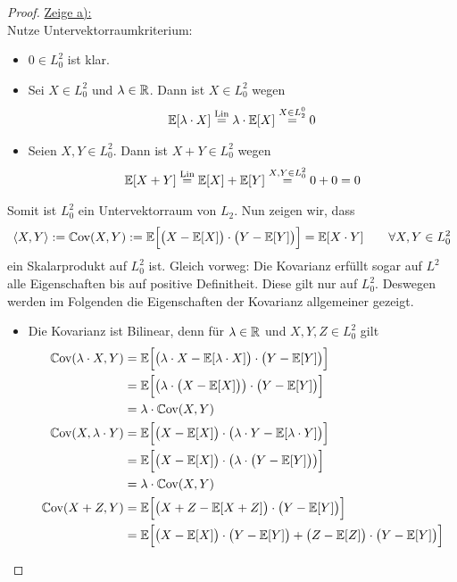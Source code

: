 \documentclass[12pt,a4paper]{article}
\begin{document}
\begin{proof}
\underline{Zeige a):}\\
Nutze Untervektorraumkriterium:
\begin{itemize}
\item $0\in L_0^2$ ist klar.
\item Sei $X\in L_0^2$ und $\lambda\in\mathbb{R}$. Dann ist $X\in L_0^2$ wegen
\begin{align*}
\mathbb{E}[\lambda\cdot X]\stackrel{\text{Lin}}{=}\lambda\cdot\mathbb{E}[X]\stackrel{X\in L_2^0}{=}0
\end{align*}
\item Seien $X,Y\in L_0^2$. Dann ist $X+Y\in L_0^2$ wegen
\begin{align*}
\mathbb{E}[X+Y]\stackrel{\text{Lin}}{=}\mathbb{E}[X]+\mathbb{E}[Y]\stackrel{X,Y\in L_0^2}{=}0+0=0
\end{align*}
\end{itemize}
Somit ist $L_0^2$ ein Untervektorraum von $L_2$. Nun zeigen wir, dass
\begin{align*}
\langle X,Y\rangle:=\mathbb{C}\text{ov}(X,Y):=
\mathbb{E}\Big[\big(X-\mathbb{E}[X]\big)\cdot\big(Y-\mathbb{E}[Y]\big)\Big]
=\mathbb{E}[X\cdot Y]
\qquad\forall X,Y\in L_0^2
\end{align*}
ein Skalarprodukt auf $L_0^2$ ist. Gleich vorweg: Die Kovarianz erfüllt sogar auf $L^2$ alle Eigenschaften bis auf positive Definitheit. Diese gilt nur auf $L_0^2$. Deswegen werden im Folgenden die Eigenschaften der Kovarianz allgemeiner gezeigt.
\begin{itemize}
\item Die Kovarianz ist Bilinear, denn für $\lambda\in\mathbb{R}$ und $X,Y,Z\in L_0^2$ gilt
\begin{align*}
\Cov(\lambda\cdot X,Y)
&=\E\Big[\big(\lambda\cdot X-\E[ \lambda\cdot X]\big)\cdot\big(Y-\E[Y]\big)\Big]\\
&=\E\Big[\big(\lambda\cdot\big(X-\E[X]\big)\big)\cdot\big(Y-\E[Y]\big)\Big]\\
&=\lambda\cdot\Cov(X,Y)\\
\Cov(X,\lambda\cdot Y)
&=\E\Big[\big(X-\E[X]\big)\cdot\big(\lambda\cdot Y-\E[\lambda\cdot Y]\big)\Big]\\
&=\E\Big[\big(X-\E[X]\big)\cdot\big(\lambda\cdot\big(Y-\E[Y]\big)\big)\Big]\\
&=\lambda\cdot\Cov(X,Y)\\
\Cov(X+Z,Y)
&=\E\Big[\big(X+Z-\E[X+Z]\big)\cdot\big(Y-\E[Y]\big)\Big]\\
&=\E\Big[\big(X-\E[X]\big)\cdot\big(Y-\E[Y]\big)+\big(Z-\E[Z]\big)\cdot\big(Y-\E[Y]\big)\Big]\\

\end{align*}
\end{itemize}
\end{proof}
\end{document}
